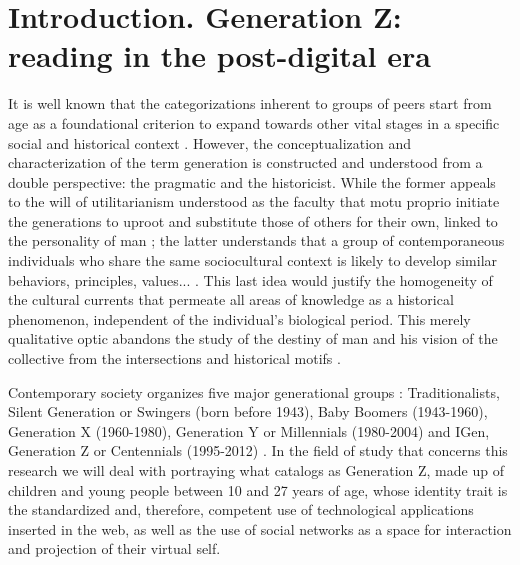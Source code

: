 \documentclass[english]{textolivre}
\begin{document}
\section{ Introduction. Generation Z: reading in the post-digital era}
It is well known that the categorizations inherent to groups of peers start from age as a foundational criterion to expand towards other vital stages in a specific social and historical context \cite{kertzer_generation_1983}. However, the conceptualization and characterization of the term generation is constructed and understood from a double perspective: the pragmatic and the historicist. While the former appeals to the will of utilitarianism understood as the faculty that motu proprio initiate the generations to uproot and substitute those of others for their own, linked to the personality of man \cite{mentre1920generations, mannheim_problema_1993}; the latter understands that a group of contemporaneous individuals who share the same sociocultural context is likely to develop similar behaviors, principles, values... \cite{manresa2016practicas, jaeger_generations_1985}. This last idea would justify the homogeneity of the cultural currents that permeate all areas of knowledge as a historical phenomenon, independent of the individual's biological period. This merely qualitative optic abandons the study of the destiny of man and his vision of the collective from the intersections and historical motifs \cite{heidegger2000tiempo}. 

Contemporary society organizes five major generational groups \cite{grail2011consumers, thecenter2016}: Traditionalists, Silent Generation or Swingers (born before 1943), Baby Boomers (1943-1960), Generation X (1960-1980), Generation Y or Millennials (1980-2004) and IGen, Generation Z or Centennials (1995-2012) \cite{zemke_generations_2013}. In the field of study that concerns this research we will deal with portraying what \textcite{schroer2008generations} catalogs as Generation Z, made up of children and young people between 10 and 27 years of age, whose identity trait is the standardized and, therefore, competent use of technological applications inserted in the web, as well as the use of social networks as a space for interaction and projection of their virtual self.
\end{document}
